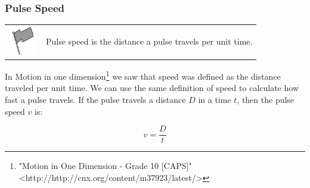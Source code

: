             \subsubsection{ Pulse Speed}
            \nopagebreak
\par
            \label{m38801*fhsst!!!underscore!!!id145}\begin{definition}
	  \begin{tabular*}{15 cm}{m{15 mm}m{}}
	\hspace*{-50pt}  \includegraphics[width=0.5in]{col11305.imgs/psflag2.png}   & \Definition{   \label{id2435275}\textbf{ Pulse Speed }} { \label{m38801*meaningfhsst!!!underscore!!!id145}
        \label{m38801*id313292}Pulse speed is the distance a pulse travels per unit time. \par 
         } 
      \end{tabular*}
      \end{definition}
        \label{m38801*id313303}In Motion in one dimension\footnote{\raggedright{}"Motion in One Dimension - Grade 10 [CAPS]" <http://http://cnx.org/content/m37923/latest/>} we saw that speed was defined as the distance traveled per unit time. We can use the same definition of speed to calculate how fast a pulse travels. If the pulse travels a distance $D$ in a time $t$, then the pulse speed $v$ is:\par 
        \label{m38801*uid4}\nopagebreak\noindent{}
    \begin{equation}
    v=\frac{D}{t}\tag{6.1}
      \end{equation}
\par
            \label{m38801*secfhsst!!!underscore!!!id161}\vspace{.5cm} 
      \noindent
